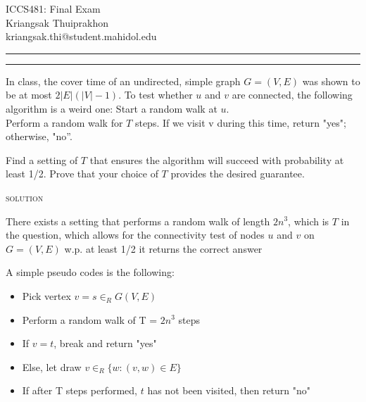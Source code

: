 \documentclass[a4paper, 11pt]{article}
\makeatletter
\newcommand{\question}[2] {\vspace{.25in} \hrule\vspace{0.5em}
\noindent{\bf #1: #2} \vspace{0.5em}
\hrule \vspace{.10in}}
\newcommand{\myname}{Kriangsak Thuiprakhon}
\newcommand{\myemail}{kriangsak.thi@student.mahidol.edu}
\makeatother
\begin{document}
\medskip                        %

\thispagestyle{plain}
\begin{center}                  %
{\Large ICCS481: Final Exam } \\
\myname \\
\myemail \\
\end{center}
\question{1: Random Walks}{}  In class, the cover time of an undirected, simple graph $G = (V, E)$ was shown to be at most $2|E|(|V| − 1)$. To test whether $u$ and $v $ are connected, the following algorithm is a weird one:
Start a random walk at $u$. \\

Perform a random walk for $T$ steps. If we visit v during this time, return "yes"; otherwise, "no”.

Find a setting of $T$ that ensures the algorithm will succeed with probability at least 1/2. Prove that your choice of $T$ provides the desired guarantee.

\textsc{solution}  
\begin{claim}
There exists a setting that performs a random walk of length $2n^3$, which is $T$ in the question, which allows for the  connectivity test of nodes  $u$ and $v$ on $G = (V, E)$ w.p. at least 1/2 it returns the correct answer
\end{claim}
 A simple pseudo codes is the following:
\begin{itemize}
\item Pick vertex $v = s \in_R G(V,E)$
\item Perform a random walk of T = $2n^3$ steps 
\item If   $v = t$, break and return "yes"
\item  Else, let draw  $v \in_R \{ w: (v,w) \in E\}$ 
\item If after T steps performed, $t$ has not been visited, then return "no"
\end{itemize}
\end{document}

